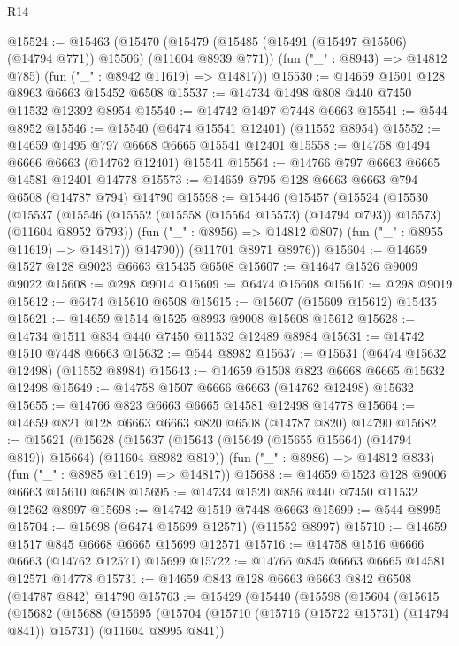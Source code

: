 \begin{lexlean}{R14}
\begin{coremodule}
@15524 := @15463
    (@15470
      (@15479 (@15485 (@15491 (@15497 @15506) (@14794 @771)) @15506) (@11604 @8939 @771))
      (fun ("_" : @8943) => @14812 @785)
      (fun ("_" : @8942 @11619) => @14817))
@15530 := @14659 @1501 @128 @8963 @6663 @15452 @6508
@15537 := @14734 @1498 @808 @440 @7450 @11532 @12392 @8954
@15540 := @14742 @1497 @7448 @6663
@15541 := @544 @8952
@15546 := @15540 (@6474 @15541 @12401) (@11552 @8954)
@15552 := @14659 @1495 @797 @6668 @6665 @15541 @12401
@15558 := @14758 @1494 @6666 @6663 (@14762 @12401) @15541
@15564 := @14766 @797 @6663 @6665 @14581 @12401 @14778
@15573 := @14659 @795 @128 @6663 @6663 @794 @6508 (@14787 @794) @14790
@15598 := @15446
    (@15457
      (@15524
        (@15530
          (@15537
            (@15546 (@15552 (@15558 (@15564 @15573) (@14794 @793)) @15573) (@11604 @8952 @793))
            (fun ("_" : @8956) => @14812 @807)
            (fun ("_" : @8955 @11619) => @14817))
          @14790))
      (@11701 @8971 @8976))
@15604 := @14659 @1527 @128 @9023 @6663 @15435 @6508
@15607 := @14647 @1526 @9009 @9022
@15608 := @298 @9014
@15609 := @6474 @15608
@15610 := @298 @9019
@15612 := @6474 @15610 @6508
@15615 := @15607 (@15609 @15612) @15435
@15621 := @14659 @1514 @1525 @8993 @9008 @15608 @15612
@15628 := @14734 @1511 @834 @440 @7450 @11532 @12489 @8984
@15631 := @14742 @1510 @7448 @6663
@15632 := @544 @8982
@15637 := @15631 (@6474 @15632 @12498) (@11552 @8984)
@15643 := @14659 @1508 @823 @6668 @6665 @15632 @12498
@15649 := @14758 @1507 @6666 @6663 (@14762 @12498) @15632
@15655 := @14766 @823 @6663 @6665 @14581 @12498 @14778
@15664 := @14659 @821 @128 @6663 @6663 @820 @6508 (@14787 @820) @14790
@15682 := @15621
    (@15628
      (@15637 (@15643 (@15649 (@15655 @15664) (@14794 @819)) @15664) (@11604 @8982 @819))
      (fun ("_" : @8986) => @14812 @833)
      (fun ("_" : @8985 @11619) => @14817))
@15688 := @14659 @1523 @128 @9006 @6663 @15610 @6508
@15695 := @14734 @1520 @856 @440 @7450 @11532 @12562 @8997
@15698 := @14742 @1519 @7448 @6663
@15699 := @544 @8995
@15704 := @15698 (@6474 @15699 @12571) (@11552 @8997)
@15710 := @14659 @1517 @845 @6668 @6665 @15699 @12571
@15716 := @14758 @1516 @6666 @6663 (@14762 @12571) @15699
@15722 := @14766 @845 @6663 @6665 @14581 @12571 @14778
@15731 := @14659 @843 @128 @6663 @6663 @842 @6508 (@14787 @842) @14790
@15763 := @15429
    (@15440
      (@15598
        (@15604
          (@15615
            (@15682
              (@15688
                (@15695
                  (@15704
                    (@15710 (@15716 (@15722 @15731) (@14794 @841)) @15731)
                    (@11604 @8995 @841))

\end{coremodule}
\end{lexlean}
